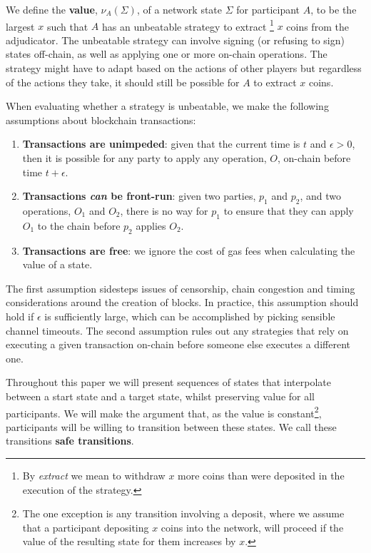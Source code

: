 \documentclass{article}
\begin{document}
We define the \textbf{value}, $\nu_A(\Sigma)$, of a network state $\Sigma$ for participant $A$,
to be the largest $x$ such that $A$ has an unbeatable strategy to extract
\footnote{By \textit{extract} we mean to withdraw $x$ more coins than were deposited in the execution of the strategy.}
$x$ coins from the adjudicator.
The unbeatable strategy can involve signing (or refusing to sign) states off-chain, as well as
applying one or more on-chain operations.
The strategy might have to adapt based on the actions of other players but regardless of
the actions they take, it should still be possible for $A$ to extract $x$ coins.

When evaluating whether a strategy is unbeatable, we make the following assumptions about blockchain transactions:
\begin{enumerate}
  \item \textbf{Transactions are unimpeded}: given that the current time is $t$ and $\epsilon > 0$, then it is possible for any party to apply any operation, $O$, on-chain before time $t + \epsilon$.
  \item \textbf{Transactions \textit{can} be front-run}: given two parties, $p_1$ and $p_2$, and two operations, $O_1$ and $O_2$, there is no way for $p_1$ to ensure that they can apply $O_1$ to the chain before $p_2$ applies $O_2$.
  \item \textbf{Transactions are free}: we ignore the cost of gas fees when calculating the value of a state.
\end{enumerate}
The first assumption sidesteps issues of censorship, chain congestion and timing considerations around the creation of blocks.
In practice, this assumption should hold if $\epsilon$ is sufficiently large, which can be accomplished by picking sensible channel timeouts.
The second assumption rules out any strategies that rely on executing a given transaction on-chain before someone else executes a different one.

Throughout this paper we will present sequences of states that interpolate between a start state and a target state, whilst preserving value for all participants.
We will make the argument that, as the value is constant\footnote{
The one exception is any transition involving a deposit, where we assume that a participant depositing
$x$ coins into the network, will proceed if the value of the resulting state for them increases by $x$.
}, participants will be willing to transition between these states.
We call these transitions \textbf{safe transitions}.
\end{document}
